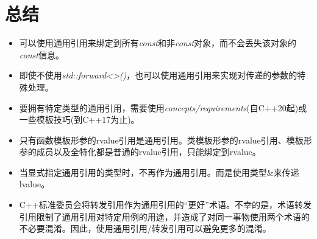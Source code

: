 \section{总结}
\begin{itemize}
	\item 可以使用通用引用来绑定到所有\textit{const}和非\textit{const}对象，而不会丢失该对象的\textit{const}信息。
	\item 即使不使用\textit{std::forward<>()}，也可以使用通用引用来实现对传递的参数的特殊处理。
	\item 要拥有特定类型的通用引用，需要使用\textit{concepts/requirements}(自C++20起)或一些模板技巧(到C++17为止)。
	\item 只有函数模板形参的rvalue引用是通用引用。类模板形参的rvalue引用、模板形参的成员以及全特化都是普通的rvalue引用，只能绑定到rvalue。
	\item 当显式指定通用引用的类型时，不再作为通用引用。而是使用类型\&来传递lvalue。
	\item C++标准委员会将转发引用作为通用引用的“更好”术语。不幸的是，术语转发引用限制了通用引用对特定用例的用途，并造成了对同一事物使用两个术语的不必要混淆。因此，使用通用引用/转发引用可以避免更多的混淆。
\end{itemize}


